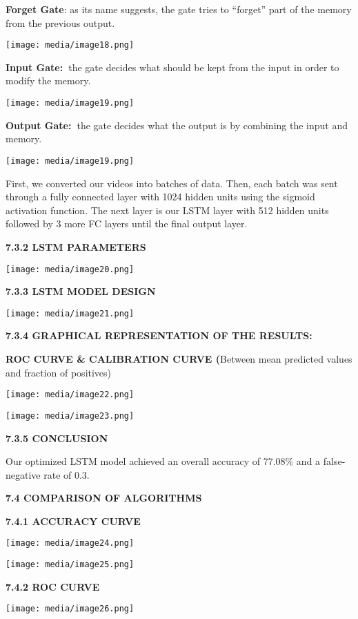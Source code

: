 \documentclass[a4paper,12pt]{article}
\begin{document}
\textbf{Forget Gate}: as its name suggests, the gate tries to ``forget''
part of the memory from the previous output.

\texttt{[image: media/image18.png]}

\textbf{Input Gate:~}the gate decides what should be kept from the input
in order to modify the memory.

\texttt{[image: media/image19.png]}

\textbf{Output Gate:~}the gate decides what the output is by combining
the input and memory.

\texttt{[image: media/image19.png]}

First, we converted our videos into batches of data. Then, each batch
was sent through a fully connected layer with 1024 hidden units using
the sigmoid activation function. The next layer is our LSTM layer with
512 hidden units followed by 3 more FC layers until the final output
layer.

\textbf{7.3.2 LSTM PARAMETERS}

\texttt{[image: media/image20.png]}

\textbf{7.3.3 LSTM MODEL DESIGN}

\texttt{[image: media/image21.png]}

\textbf{7.3.4 GRAPHICAL REPRESENTATION OF THE RESULTS:}

\textbf{ROC CURVE \& CALIBRATION CURVE (}Between mean predicted values
and fraction of positives)

\texttt{[image: media/image22.png]}

\texttt{[image: media/image23.png]}

\textbf{7.3.5 CONCLUSION}

Our optimized LSTM model achieved an overall accuracy of 77.08\% and a
false-negative rate of 0.3.

\textbf{7.4 COMPARISON OF ALGORITHMS}

\textbf{7.4.1 ACCURACY CURVE}

\texttt{[image: media/image24.png]}

\texttt{[image: media/image25.png]}

\textbf{7.4.2 ROC CURVE}

\texttt{[image: media/image26.png]}
\end{document}
